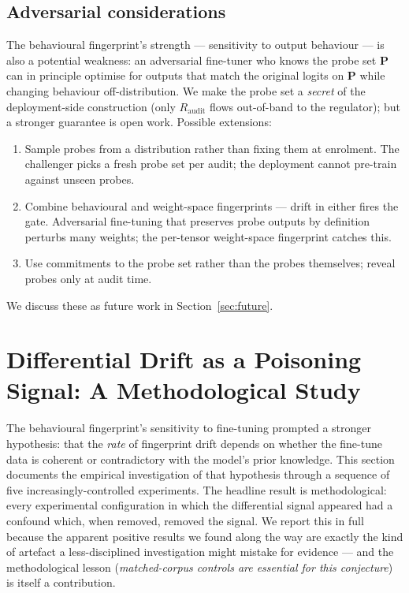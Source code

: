 \documentclass[11pt,a4paper]{article}
\begin{document}
\subsection{Adversarial considerations}
\label{sec:model:adversarial}

The behavioural fingerprint's strength — sensitivity to output
behaviour — is also a potential weakness: an adversarial
fine\nobreakdash-tuner who knows the probe set $\mathbf{P}$ can in
principle optimise for outputs that match the original logits on
$\mathbf{P}$ while changing behaviour off\nobreakdash-distribution.
We make the probe set a \emph{secret} of the deployment\nobreakdash-side
construction (only $R_{\mathrm{audit}}$ flows out\nobreakdash-of\nobreakdash-band
to the regulator); but a stronger guarantee is open work.  Possible
extensions:

\begin{enumerate}
  \item Sample probes from a distribution rather than fixing them
        at enrolment.  The challenger picks a fresh probe set per
        audit; the deployment cannot pre\nobreakdash-train against
        unseen probes.
  \item Combine behavioural and weight\nobreakdash-space fingerprints
        — drift in either fires the gate.  Adversarial fine\nobreakdash-tuning
        that preserves probe outputs by definition perturbs many
        weights; the per\nobreakdash-tensor weight\nobreakdash-space
        fingerprint catches this.
  \item Use commitments to the probe set rather than the probes
        themselves; reveal probes only at audit time.
\end{enumerate}

We discuss these as future work in Section~\ref{sec:future}.

\section{Differential Drift as a Poisoning Signal: A Methodological
  Study}
\label{sec:poisoning}

The behavioural fingerprint's sensitivity to fine\nobreakdash-tuning
prompted a stronger hypothesis: that the \emph{rate} of fingerprint
drift depends on whether the fine\nobreakdash-tune data is coherent
or contradictory with the model's prior knowledge.  This section
documents the empirical investigation of that hypothesis through a
sequence of five increasingly\nobreakdash-controlled experiments.
The headline result is methodological: every experimental
configuration in which the differential signal appeared had a
confound which, when removed, removed the signal.  We report this
in full because the apparent positive results we found along the
way are exactly the kind of artefact a less\nobreakdash-disciplined
investigation might mistake for evidence — and the methodological
lesson (\emph{matched\nobreakdash-corpus controls are essential for
this conjecture}) is itself a contribution.
\end{document}
